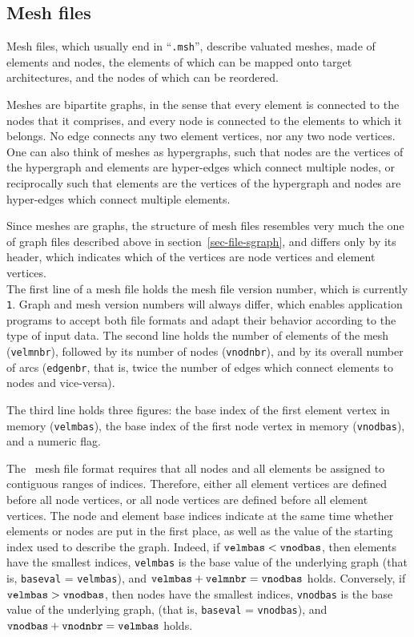 \subsection{Mesh files}
\label{sec-file-smesh}

Mesh files, which usually end in ``\texttt{\@.msh}'', describe valuated
meshes, made of elements and nodes, the elements of which can be
mapped onto target architectures, and the nodes of which can be
reordered.

Meshes are bipartite graphs, in the sense that every element is
connected to the nodes that it comprises, and every node is connected
to the elements to which it belongs. No edge connects any two element
vertices, nor any two node vertices.  One can also think of meshes as
hypergraphs, such that nodes are the vertices of the hypergraph and
elements are hyper-edges which connect multiple nodes, or reciprocally
such that elements are the vertices of the hypergraph and nodes are
hyper-edges which connect multiple elements.

Since meshes are graphs, the structure of mesh files resembles very
much the one of graph files described above in
section~\ref{sec-file-sgraph}, and differs only by its header, which
indicates which of the vertices are node vertices and element
vertices.
\\

The first line of a mesh file holds the mesh file version number,
which is currently \texttt{1}. Graph and mesh version numbers will always
differ, which enables application programs to accept both file formats
and adapt their behavior according to the type of input data.  The
second line holds the number of elements of the mesh (\texttt{velmnbr}),
followed by its number of nodes (\texttt{vnodnbr}), and by its overall
number of arcs (\texttt{edgenbr}, that is, twice the number of edges
which connect elements to nodes and vice-versa).

The third line holds three figures: the base index of the first
element vertex in memory (\texttt{velmbas}), the base index of the first
node vertex in memory (\texttt{vnodbas}), and a numeric flag.

The \scotch\ mesh file format requires that all nodes and all elements
be assigned to contiguous ranges of indices. Therefore, either all
element vertices are defined before all node vertices, or all node
vertices are defined before all element vertices. The node and element
base indices indicate at the same time whether elements or nodes are
put in the first place, as well as the value of the starting index
used to describe the graph. Indeed, if
$\mbox{\texttt{velm}}\-\mbox{\texttt{bas}} <
\mbox{\texttt{vnod}}\-\mbox{\texttt{bas}}$, then elements have the 
smallest indices, \texttt{velmbas} is the base value of the underlying
graph (that is, \texttt{baseval} = \texttt{velmbas}), and
$\mbox{\texttt{velmbas}} + \mbox{\texttt{velmnbr}} =
\mbox{\texttt{vnodbas}}$
holds. Conversely, if $\mbox{\texttt{velm}}\-\mbox{\texttt{bas}}
> \mbox{\texttt{vnod}}\-\mbox{\texttt{bas}}$, then nodes have the
smallest indices, \texttt{vnodbas} is the base value of the underlying
graph, (that is, \texttt{baseval} = \texttt{vnodbas}), and
$\mbox{\texttt{vnodbas}} + \mbox{\texttt{vnodnbr}} =
\mbox{\texttt{velmbas}}$ holds.

